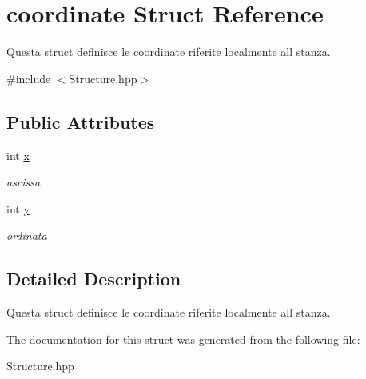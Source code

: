 \hypertarget{structcoordinate}{}\section{coordinate Struct Reference}
\label{structcoordinate}


Questa struct definisce le coordinate riferite localmente all stanza.  




{\ttfamily \#include $<$Structure.\+hpp$>$}

\subsection*{Public Attributes}
\begin{DoxyCompactItemize}
\item 
\hypertarget{structcoordinate_a1431128cf99def93975d05db27bc251f}{}int \hyperlink{structcoordinate_a1431128cf99def93975d05db27bc251f}{x}\label{structcoordinate_a1431128cf99def93975d05db27bc251f}

\begin{DoxyCompactList}\small\item\em ascissa \end{DoxyCompactList}\item 
\hypertarget{structcoordinate_aee8f883e3734f5c1e4be9425c7308a35}{}int \hyperlink{structcoordinate_aee8f883e3734f5c1e4be9425c7308a35}{y}\label{structcoordinate_aee8f883e3734f5c1e4be9425c7308a35}

\begin{DoxyCompactList}\small\item\em ordinata \end{DoxyCompactList}\end{DoxyCompactItemize}


\subsection{Detailed Description}
Questa struct definisce le coordinate riferite localmente all stanza. 

The documentation for this struct was generated from the following file\+:\begin{DoxyCompactItemize}
\item 
Structure.\+hpp\end{DoxyCompactItemize}
